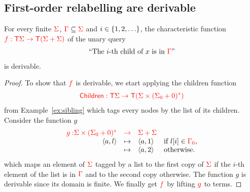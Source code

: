 \subsection{First-order relabelling are derivable}\label{sec:relabeling}

\begin{lemma}\label{lem:nextmod}
  For every finite ${\color{red}{\Sigma}}$, ${\color{red}{\Gamma}}\subseteq {\color{red}{\Sigma}}$ and $i \in \{1,2,\ldots\}$, the characteristic function ${\color{red}{f:{\color{red}{\mathsf T}}{\color{red}{\Sigma}}\to{\color{red}{\mathsf T}}({\color{red}{\Sigma}}+{\color{red}{\Sigma}})}}$ of the  unary query 
        \begin{align*}
\text{``The }i\text{-th child of }x\text{ is in }{\color{red}{\Gamma}}\text{''}
        \end{align*}
        is derivable.
\end{lemma}
\begin{proof}
To show that ${\color{red}{f}}$ is derivable, we start applying the children function \begin{align*}
{\color{red}{\mathsf{Children}:{\color{red}{\mathsf T}}{\color{red}{\Sigma}}\to {\color{red}{\mathsf T}}({\color{red}{\Sigma}}\times({\color{red}{\Sigma}}_0+0)^*)}}
\end{align*} from Example~\ref{ex:sibling} which tags every nodes by the list of its children. Consider the function $g$
$$\begin{array}{rlll}
{\color{red}{g:}}  {\color{red}{{\color{red}{\Sigma}}\times({\color{red}{\Sigma}}_0+0)^*}} &{\color{red}{\to}}& {\color{red}{\Sigma +\Sigma}}&\\
            \langle{a,l}\rangle                           &
     \mapsto& \langle{a,1}\rangle              &\text{if } l[i]\in{\color{red}{{\color{red}{\Gamma}}_0}}, \\
                    &   \mapsto& \langle{a,2}\rangle &\text{otherwise.}   
\end{array}$$
which maps an element of ${\color{red}{\Sigma}}$ tagged by a list to the first copy of ${\color{red}{\Sigma}}$ if the $i$-th element of the list is in ${\color{red}{\Gamma}}$ and to the second copy otherwise. The function $g$ is derivable since its domain is finite.
We finally get ${\color{red}{f}}$ by lifting ${\color{red}{g}}$ to terms.
\end{proof}

